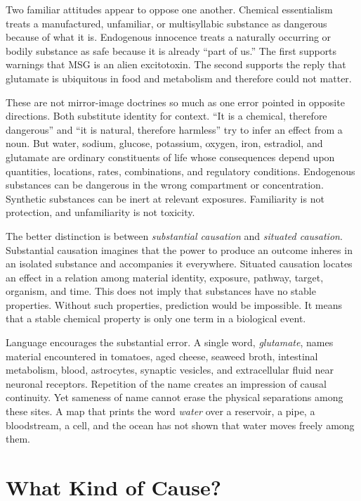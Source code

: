 \documentclass[11pt]{article}
\begin{document}
Two familiar attitudes appear to oppose one another. Chemical essentialism treats a manufactured, unfamiliar, or multisyllabic substance as dangerous because of what it is. Endogenous innocence treats a naturally occurring or bodily substance as safe because it is already ``part of us.'' The first supports warnings that MSG is an alien excitotoxin. The second supports the reply that glutamate is ubiquitous in food and metabolism and therefore could not matter.

These are not mirror-image doctrines so much as one error pointed in opposite directions. Both substitute identity for context. ``It is a chemical, therefore dangerous'' and ``it is natural, therefore harmless'' try to infer an effect from a noun. But water, sodium, glucose, potassium, oxygen, iron, estradiol, and glutamate are ordinary constituents of life whose consequences depend upon quantities, locations, rates, combinations, and regulatory conditions. Endogenous substances can be dangerous in the wrong compartment or concentration. Synthetic substances can be inert at relevant exposures. Familiarity is not protection, and unfamiliarity is not toxicity.

The better distinction is between \emph{substantial causation} and \emph{situated causation}. Substantial causation imagines that the power to produce an outcome inheres in an isolated substance and accompanies it everywhere. Situated causation locates an effect in a relation among material identity, exposure, pathway, target, organism, and time. This does not imply that substances have no stable properties. Without such properties, prediction would be impossible. It means that a stable chemical property is only one term in a biological event.

Language encourages the substantial error. A single word, \emph{glutamate}, names material encountered in tomatoes, aged cheese, seaweed broth, intestinal metabolism, blood, astrocytes, synaptic vesicles, and extracellular fluid near neuronal receptors. Repetition of the name creates an impression of causal continuity. Yet sameness of name cannot erase the physical separations among these sites. A map that prints the word \emph{water} over a reservoir, a pipe, a bloodstream, a cell, and the ocean has not shown that water moves freely among them.

\section{What Kind of Cause?}
\end{document}
